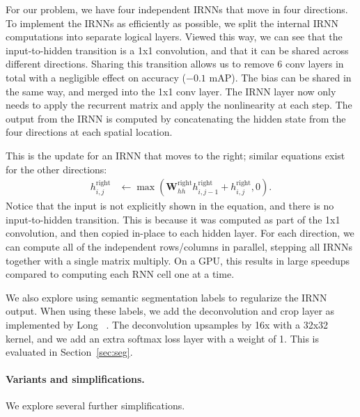 \documentclass[10pt,twocolumn,letterpaper]{article}
\begin{document}
For our problem, we have four independent IRNNs that move in four directions.
To implement the IRNNs as efficiently as possible, we split the internal IRNN
computations into separate logical layers.  Viewed this way, we can see that
the input-to-hidden transition is a 1x1 convolution, and that it can be shared
across different directions.
Sharing this transition allows us to remove 6 conv layers in total with a
negligible effect on accuracy ($-0.1$ mAP).
The bias can be shared in the same way, and
merged into the 1x1 conv layer.  The IRNN layer now only needs to apply
the recurrent matrix and apply the nonlinearity at each step.  The output
from the IRNN is computed by concatenating the hidden state from the four
directions at each spatial location.

This is the update for an IRNN that moves to the right; similar equations exist
for the other directions:
\begin{align}
  h_{i,j}^\text{right} &\gets \max\left(
    \mathbf{W}_{hh}^\text{right} h_{i,j-1}^\text{right} + h_{i,j}^\text{right},
    0 \right).
  \label{eq:rnn}
\end{align}
Notice that the input is not explicitly shown in the equation, and there is no
input-to-hidden transition.  This is because it was computed as part of the 1x1
convolution, and then copied in-place to each hidden layer.
%
For each direction, we can compute all of the independent rows/columns in
parallel, stepping all IRNNs together with a single matrix multiply.  On a GPU,
this results in large speedups compared to computing each RNN cell one at a
time.

We also explore using semantic segmentation labels to regularize the IRNN
output.  When using these labels, we add the deconvolution and crop layer as
implemented by Long \etal~\cite{fcn}.  The deconvolution upsamples by 16x with a
32x32 kernel, and we add an extra softmax loss layer with a weight of 1.  This
is evaluated in Section~\ref{sec:seg}.

\paragraph{Variants and simplifications.} We explore several
further simplifications.
\end{document}
